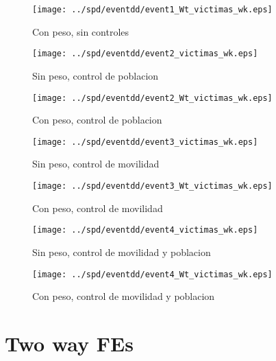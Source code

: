 \documentclass[11pt,letterpaper]{article}
\begin{document}
\begin{figure}[hbtp]
\caption{Con peso, sin controles}
\centering
\texttt{[image: ../spd/eventdd/event1\_Wt\_victimas\_wk.eps]}
\end{figure}
\begin{figure}[hbtp]
\caption{Sin peso, control de poblacion}
\centering
\texttt{[image: ../spd/eventdd/event2\_victimas\_wk.eps]}
\end{figure}

\begin{figure}[hbtp]
\caption{Con peso, control de poblacion}
\centering
\texttt{[image: ../spd/eventdd/event2\_Wt\_victimas\_wk.eps]}
\end{figure}
\begin{figure}[hbtp]
\caption{Sin peso, control de movilidad}
\centering
\texttt{[image: ../spd/eventdd/event3\_victimas\_wk.eps]}
\end{figure}

\begin{figure}[hbtp]
\caption{Con peso, control de movilidad}
\centering
\texttt{[image: ../spd/eventdd/event3\_Wt\_victimas\_wk.eps]}
\end{figure}
\begin{figure}[hbtp]
\caption{Sin peso, control de movilidad y poblacion}
\centering
\texttt{[image: ../spd/eventdd/event4\_victimas\_wk.eps]}
\end{figure}

\begin{figure}[hbtp]
\caption{Con peso, control de movilidad y poblacion}
\centering
\texttt{[image: ../spd/eventdd/event4\_Wt\_victimas\_wk.eps]}
\end{figure}

\section{Two way FEs}
\end{document}
